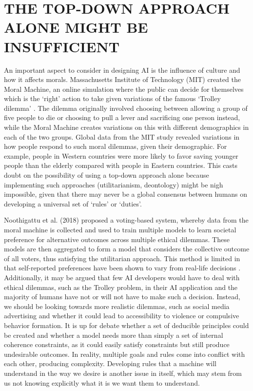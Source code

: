 \documentclass[10pt]{article}
\begin{document}
\section{THE TOP-DOWN APPROACH ALONE MIGHT BE INSUFFICIENT}


An important aspect to consider in designing AI is the influence of culture and how it affects morals. Massachusetts Institute of Technology (MIT) created the Moral Machine, an online simulation where the public can decide for themselves which is the ‘right’ action to take given variations of the famous ‘Trolley dilemma’ \textsuperscript{\cite{awad_moral_2018}}. The dilemma originally involved choosing between allowing a group of five people to die or choosing to pull a lever
and sacrificing one person instead, while the Moral Machine creates variations on this with different demographics
in each of the two groups. Global data from the MIT study revealed variations in how people respond to such moral dilemmas, given their demographic. For example, people in Western countries were more likely to favor saving younger people than the elderly compared with people in Eastern countries. This casts doubt on the possibility of using a top-down approach alone because implementing such approaches (utilitarianism, deontology) might be nigh impossible, given that there may never be a global consensus between humans on developing a universal set of ‘rules’ or ‘duties’.

Noothigattu et al. (2018) proposed a voting-based system, whereby data from the moral machine is collected and used to train multiple models to learn societal preference for alternative outcomes across multiple ethical dilemmas. These models are then aggregated to form a model that considers the collective outcome of all voters, thus satisfying the utilitarian approach. This method is limited in that self-reported preferences have been shown to vary from real-life decisions \textsuperscript{\cite{noothigattu_voting-based_2018}}. Additionally, it may be argued that few AI developers would have to deal with ethical dilemmas, such as the Trolley problem, in their AI application and the majority of humans have not or will not have to make such a decision. Instead, we should be looking towards more realistic dilemmas, such as social media advertising and whether it could lead to accessibility to violence or compulsive behavior formation. It is up for debate whether a set of deducible principles could be created and whether a model needs more than simply a set of internal coherence constraints, as it could easily satisfy constraints but still produce undesirable outcomes. In reality, multiple goals and rules come into conflict with each other, producing complexity. Developing rules that a machine will understand in the way we desire is another issue in itself, which may stem from us not knowing explicitly what it is we want them to understand\textsuperscript{\cite{badea_morality_2022}}. 
\end{document}
